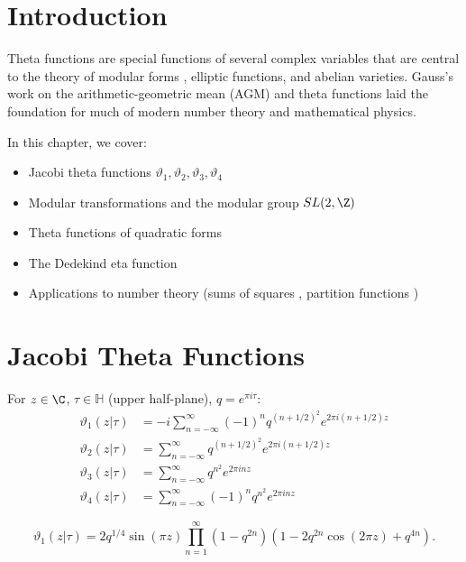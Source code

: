 \section{Introduction}

Theta functions  are special functions of several complex variables that are central to the theory of modular forms , elliptic functions, and abelian varieties. Gauss's work on the arithmetic-geometric mean (AGM) and theta functions laid the foundation for much of modern number theory and mathematical physics.

In this chapter, we cover:
\begin{itemize}
    \item Jacobi theta functions  $\vartheta_1, \vartheta_2, \vartheta_3, \vartheta_4$
    \item Modular transformations and the modular group  $SL(2,\Z)$
    \item Theta functions of quadratic forms
    \item The Dedekind eta function 
    \item Applications to number theory (sums of squares , partition functions )
\end{itemize}

\section{Jacobi Theta Functions}

\begin{definition}
For $z \in \C$, $\tau \in \mathbb{H}$ (upper half-plane), $q = e^{\pi i \tau}$:
\begin{align*}
\vartheta_1(z|\tau) &= -i \sum_{n=-\infty}^{\infty} (-1)^n q^{(n+1/2)^2} e^{2\pi i (n+1/2)z} \\
\vartheta_2(z|\tau) &= \sum_{n=-\infty}^{\infty} q^{(n+1/2)^2} e^{2\pi i (n+1/2)z} \\
\vartheta_3(z|\tau) &= \sum_{n=-\infty}^{\infty} q^{n^2} e^{2\pi i n z} \\
\vartheta_4(z|\tau) &= \sum_{n=-\infty}^{\infty} (-1)^n q^{n^2} e^{2\pi i n z}
\end{align*}
\end{definition}

\begin{theorem}
\[
\vartheta_1(z|\tau) = 2 q^{1/4} \sin(\pi z) \prod_{n=1}^{\infty} (1 - q^{2n})(1 - 2 q^{2n} \cos(2\pi z) + q^{4n}).
\]
\end{theorem}

